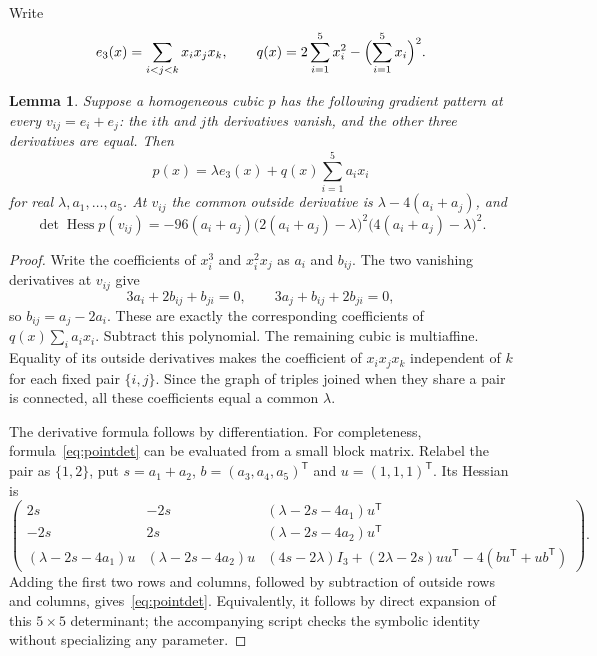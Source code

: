 \documentclass[11pt]{article}
\newtheorem{lemma}[theorem]{Lemma}
\newcommand{\Hess}{\operatorname{Hess}}
\begin{document}
Write
\[
 e_3(x)=\sum_{i<j<k}x_ix_jx_k,\qquad
 q(x)=2\sum_{i=1}^5x_i^2-\Bigl(\sum_{i=1}^5x_i\Bigr)^2.
\]
\begin{lemma}\label{lem:cubic}
Suppose a homogeneous cubic $p$ has the following gradient pattern at every $v_{ij}=e_i+e_j$: the $i$th and $j$th derivatives vanish, and the other three derivatives are equal. Then
\begin{equation}\label{eq:family}
 p(x)=\lambda e_3(x)+q(x)\sum_{i=1}^5a_ix_i
\end{equation}
for real $\lambda,a_1,\ldots,a_5$. At $v_{ij}$ the common outside derivative is $\lambda-4(a_i+a_j)$, and
\begin{equation}\label{eq:pointdet}
 \det\Hess p(v_{ij})
 =-96(a_i+a_j)\bigl(2(a_i+a_j)-\lambda\bigr)^2
                      \bigl(4(a_i+a_j)-\lambda\bigr)^2.
\end{equation}
\end{lemma}
\begin{proof}
Write the coefficients of $x_i^3$ and $x_i^2x_j$ as $a_i$ and $b_{ij}$. The two vanishing derivatives at $v_{ij}$ give
\[
 3a_i+2b_{ij}+b_{ji}=0,\qquad
 3a_j+b_{ij}+2b_{ji}=0,
\]
so $b_{ij}=a_j-2a_i$. These are exactly the corresponding coefficients of $q(x)\sum_i a_ix_i$. Subtract this polynomial. The remaining cubic is multiaffine. Equality of its outside derivatives makes the coefficient of $x_ix_jx_k$ independent of $k$ for each fixed pair $\{i,j\}$. Since the graph of triples joined when they share a pair is connected, all these coefficients equal a common $\lambda$.

The derivative formula follows by differentiation. For completeness, formula~\eqref{eq:pointdet} can be evaluated from a small block matrix. Relabel the pair as $\{1,2\}$, put $s=a_1+a_2$, $b=(a_3,a_4,a_5)^{\mathsf T}$ and $u=(1,1,1)^{\mathsf T}$. Its Hessian is
\[
 \begin{pmatrix}
 2s&-2s&(\lambda-2s-4a_1)u^{\mathsf T}\\
 -2s&2s&(\lambda-2s-4a_2)u^{\mathsf T}\\
 (\lambda-2s-4a_1)u&(\lambda-2s-4a_2)u&
 (4s-2\lambda)I_3+(2\lambda-2s)uu^{\mathsf T}-4(bu^{\mathsf T}+ub^{\mathsf T})
 \end{pmatrix}.
\]
Adding the first two rows and columns, followed by subtraction of outside rows and columns, gives~\eqref{eq:pointdet}. Equivalently, it follows by direct expansion of this $5\times5$ determinant; the accompanying script checks the symbolic identity without specializing any parameter.
\end{proof}
\end{document}
